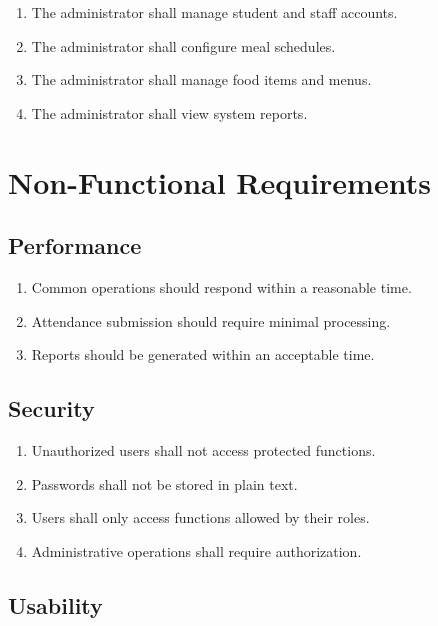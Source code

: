 \documentclass[12pt,a4paper]{report}
\begin{document}
	\begin{enumerate}[leftmargin=*]
		\item The administrator shall manage student and staff accounts.
		\item The administrator shall configure meal schedules.
		\item The administrator shall manage food items and menus.
		\item The administrator shall view system reports.
	\end{enumerate}
	
	
	\section{Non-Functional Requirements}
	
	\subsection{Performance}
	
	\begin{enumerate}[leftmargin=*]
		\item Common operations should respond within a reasonable time.
		\item Attendance submission should require minimal processing.
		\item Reports should be generated within an acceptable time.
	\end{enumerate}
	
	\subsection{Security}
	
	\begin{enumerate}[leftmargin=*]
		\item Unauthorized users shall not access protected functions.
		\item Passwords shall not be stored in plain text.
		\item Users shall only access functions allowed by their roles.
		\item Administrative operations shall require authorization.
	\end{enumerate}
	
	\subsection{Usability}
	
\end{document}
